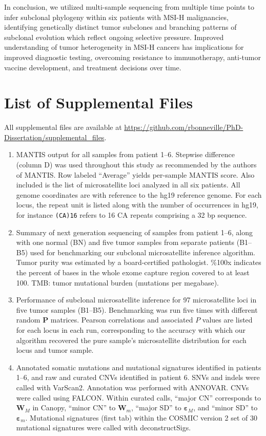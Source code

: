 In conclusion, we utilized multi-sample sequencing from multiple time points to infer subclonal phylogeny within six patients with MSI-H malignancies, identifying genetically distinct tumor subclones and branching patterns of subclonal evolution which reflect ongoing selective pressure. Improved understanding of tumor heterogeneity in MSI-H cancers has implications for improved diagnostic testing, overcoming resistance to immunotherapy, anti-tumor vaccine development, and treatment decisions over time.

\section{List of Supplemental Files}
All supplemental files are available at \url{https://github.com/rbonneville/PhD-Dissertation/supplemental_files}.
\begin{enumerate}
    \renewcommand*{\labelenumi}{S\thechapter{}.\arabic{enumi}. }
    \item MANTIS output for all samples from patient 1--6. Stepwise difference (column D) was used throughout this study as recommended by the authors of MANTIS\@. Row labeled ``Average'' yields per-sample MANTIS score. Also included is the list of microsatellite loci analyzed in all six patients. All genome coordinates are with reference to the hg19 reference genome. For each locus, the repeat unit is listed along with the number of occurrences in hg19, for instance \texttt{(CA)16} refers to 16 CA repeats comprising a 32 bp sequence.
    \item Summary of next generation sequencing of samples from patient 1--6, along with one normal (BN) and five tumor samples from separate patients (B1--B5) used for benchmarking our subclonal microsatellite inference algorithm. Tumor purity was estimated by a board-certified pathologist. \%100x indicates the percent of bases in the whole exome capture region covered to at least 100\texttimes{}. TMB: tumor mutational burden (mutations per megabase).
	\item Performance of subclonal microsatellite inference for 97 microsatellite loci in five tumor samples (B1--B5). Benchmarking was run five times with different random $\mathbf{P}$ matrices. Pearson correlations and associated $P$ values are listed for each locus in each run, corresponding to the accuracy with which our algorithm recovered the pure sample's microsatellite distribution for each locus and tumor sample.
    \item Annotated somatic mutations and mutational signatures identified in patients 1--6, and raw and curated CNVs identified in patient 6. SNVs and indels were called with VarScan2. Annotation was performed with ANNOVAR\@. CNVs were called using FALCON\@. Within curated calls, ``major CN'' corresponds to $\mathbf{W}_M$ in Canopy, ``minor CN'' to $\mathbf{W}_m$, ``major SD'' to $\mathbf{\varepsilon}_M$, and ``minor SD'' to $\mathbf{\varepsilon}_m$. Mutational signatures (first tab) within the COSMIC version 2 set of 30 mutational signatures were called with deconstructSigs.

\end{enumerate}
